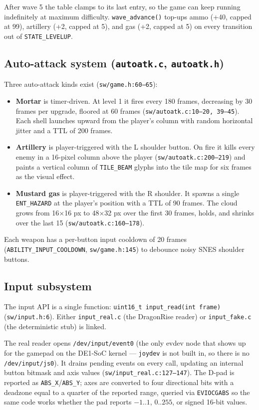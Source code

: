 \documentclass[11pt,letterpaper]{article}
\begin{document}
After wave 5 the table clamps to its last entry, so the game can keep running
indefinitely at maximum difficulty. \texttt{wave\_advance()} top-ups ammo
(+40, capped at 99), artillery (+2, capped at 5), and gas (+2, capped at 5)
on every transition out of \texttt{STATE\_LEVELUP}.

\subsection{Auto-attack system (\texttt{autoatk.c}, \texttt{autoatk.h})}

Three auto-attack kinds exist (\texttt{sw/game.h:60--65}):

\begin{itemize}[leftmargin=*]
  \item \textbf{Mortar} is timer-driven. At level 1 it fires every 180 frames,
    decreasing by 30 frames per upgrade, floored at 60 frames
    (\texttt{sw/autoatk.c:10--20, 39--45}). Each shell launches upward from
    the player's column with random horizontal jitter and a TTL of 200 frames.
  \item \textbf{Artillery} is player-triggered with the L shoulder button. On
    fire it kills every enemy in a 16-pixel column above the player
    (\texttt{sw/autoatk.c:200--219}) and paints a vertical column of
    \texttt{TILE\_BEAM} glyphs into the tile map for six frames as the visual
    effect.
  \item \textbf{Mustard gas} is player-triggered with the R shoulder. It
    spawns a single \texttt{ENT\_HAZARD} at the player's position with a TTL
    of 90 frames. The cloud grows from 16$\times$16 px to 48$\times$32 px
    over the first 30 frames, holds, and shrinks over the last 15
    (\texttt{sw/autoatk.c:160--178}).
\end{itemize}

Each weapon has a per-button input cooldown of 20 frames
(\texttt{ABILITY\_INPUT\_COOLDOWN}, \texttt{sw/game.h:145}) to debounce noisy
SNES shoulder buttons.

\subsection{Input subsystem}

The input API is a single function:
\texttt{uint16\_t input\_read(int frame)} (\texttt{sw/input.h:6}). Either
\texttt{input\_real.c} (the DragonRise reader) or \texttt{input\_fake.c}
(the deterministic stub) is linked.

The real reader opens \texttt{/dev/input/event0} (the only evdev node that
shows up for the gamepad on the DE1-SoC kernel --- \texttt{joydev} is not
built in, so there is no \texttt{/dev/input/js0}). It drains pending events
on every call, updating an internal button bitmask and axis values
(\texttt{sw/input\_real.c:127--147}). The D-pad is reported as
\texttt{ABS\_X}/\texttt{ABS\_Y}; axes are converted to four directional bits
with a deadzone equal to a quarter of the reported range, queried via
\texttt{EVIOCGABS} so the same code works whether the pad reports $-1..1$,
$0..255$, or signed 16-bit values.
\end{document}

